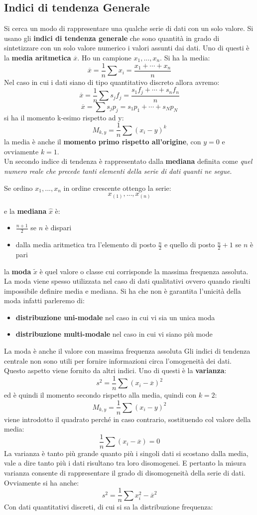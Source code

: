 \documentclass[a4paper,12pt, oneside]{book}
\begin{document}
\subsection{Indici di tendenza Generale}
Si cerca un modo di rappresentare una qualche serie di dati con un solo valore. Si usano gli \textbf{indici di tendenza generale} che sono quantità in grado di sintetizzare con un solo valore numerico i valori assunti dai dati. Uno di questi è la \textbf{media aritmetica} $\overline{x}$. Ho un campione $x_1,...,x_n$. Si ha la media:
$$\overline{x}=\frac{1}{n}\sum	x_i=\frac{x_1+\cdots+x_n}{n}$$
Nel caso in cui i dati siano di tipo quantitativo discreto allora avremo:
$$\overline{x}=\frac{1}{n}\sum	s_jf_j=\frac{s_1f_j+\cdots+s_nf_n}{n}$$
$$\overline{x}=\sum	s_jp_j=s_1p_1+\cdots+s_Np_N$$
si ha il momento k-esimo rispetto ad y:
$$M_{k,y}=\frac{1}{n}\sum{(x_i-y)^k}$$
la media è anche il \textbf{momento primo rispetto all'origine}, con $y=0$ e ovviamente $k=1$.
\\
\newpage
Un secondo indice di tendenza è rappresentato dalla \textbf{mediana} definita come \textit{quel numero reale che precede tanti elementi della serie di dati quanti ne segue}. 

Se ordino $x_1,...,x_n$ in ordine crescente ottengo la serie:
$$x_{(1)},...,x_{(n)}$$

e la \textbf{mediana} $\hat{x}$ è:
\begin{itemize}
\item $\frac{n+1}{2}$ se $n$ è dispari
\item dalla media aritmetica tra l'elemento di posto $\frac{n}{2}$ e quello di posto $\frac{n}{2}+1$ se $n$ è pari
\end{itemize}
la \textbf{moda} $\widetilde{x}$ è quel valore o classe cui corrisponde la massima frequenza assoluta. La moda viene spesso utilizzata nel caso di dati qualitativi ovvero quando risulti
impossibile definire media e mediana. Si ha che non è garantita l'unicità della moda infatti parleremo di:
\begin{itemize}
\item \textbf{distribuzione uni-modale} nel caso in cui vi sia un unica moda
\item \textbf{distribuzione multi-modale} nel caso in cui vi siano più mode
\end{itemize}
La moda è anche il valore con massima frequenza assoluta
Gli indici di tendenza centrale non sono utili per fornire informazioni circa l'omogeneità dei dati. Questo aspetto viene fornito da altri indici. Uno di questi è la \textbf{varianza}:
$$s^2=\frac{1}{n}\sum (x_i-\overline{x})^2$$
ed è quindi il momento secondo rispetto alla media, quindi con $k=2$:
$$M_{k,y}=\frac{1}{n}\sum (x_i-y)^2$$
viene introdotto il quadrato perché in caso contrario, sostituendo col valore della media:
$$\frac{1}{n}\sum (x_i-\overline{x})=0$$
La varianza è tanto più grande quanto più i singoli dati si scostano dalla media, vale a dire tanto più i dati risultano tra loro disomogenei. E pertanto la misura varianza consente di rappresentare il grado di disomogeneità della serie di dati. Ovviamente si ha anche:
$$s^2=\frac{1}{n}\sum x_i^2-\overline{x}^2$$
Con dati quantitativi discreti, di cui si sa la distribuzione frequenza:
\end{document}
